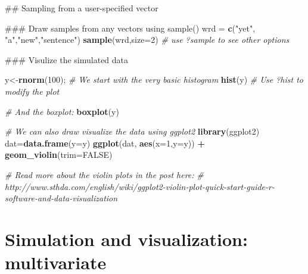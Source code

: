 \documentclass[12pt,]{book}
\newenvironment{Shaded}{\begin{snugshade}}{\end{snugshade}}
\newcommand{\KeywordTok}[1]{\textcolor[rgb]{0.13,0.29,0.53}{\textbf{#1}}}
\newcommand{\DataTypeTok}[1]{\textcolor[rgb]{0.13,0.29,0.53}{#1}}
\newcommand{\DecValTok}[1]{\textcolor[rgb]{0.00,0.00,0.81}{#1}}
\newcommand{\StringTok}[1]{\textcolor[rgb]{0.31,0.60,0.02}{#1}}
\newcommand{\CommentTok}[1]{\textcolor[rgb]{0.56,0.35,0.01}{\textit{#1}}}
\newcommand{\OtherTok}[1]{\textcolor[rgb]{0.56,0.35,0.01}{#1}}
\newcommand{\OperatorTok}[1]{\textcolor[rgb]{0.81,0.36,0.00}{\textbf{#1}}}
\newcommand{\NormalTok}[1]{#1}
\begin{document}
\begin{Shaded}
\begin{Highlighting}[]
\NormalTok{## Sampling from a user-specified vector }

\NormalTok{### Draw samples from any vectors using sample()}
\NormalTok{wrd =}\StringTok{ }\KeywordTok{c}\NormalTok{(}\StringTok{"yet"}\NormalTok{, }\StringTok{"a"}\NormalTok{,}\StringTok{"new"}\NormalTok{,}\StringTok{"sentence"}\NormalTok{)}
\KeywordTok{sample}\NormalTok{(wrd,}\DataTypeTok{size=}\DecValTok{2}\NormalTok{)}
\CommentTok{# use ?sample to see other options}
\end{Highlighting}
\end{Shaded}

\begin{Shaded}
\begin{Highlighting}[]
\NormalTok{### Visulize the simulated data}

\NormalTok{y<-}\KeywordTok{rnorm}\NormalTok{(}\DecValTok{100}\NormalTok{);}
\CommentTok{# We start with the very basic histogram }
\KeywordTok{hist}\NormalTok{(y)}
\CommentTok{# Use ?hist to modify the plot }

\CommentTok{# And the boxplot:}
\KeywordTok{boxplot}\NormalTok{(y)}

\CommentTok{# We can also draw visualize the data using ggplot2}
\KeywordTok{library}\NormalTok{(ggplot2)}
\NormalTok{dat=}\KeywordTok{data.frame}\NormalTok{(}\DataTypeTok{y=}\NormalTok{y)}
\KeywordTok{ggplot}\NormalTok{(dat, }\KeywordTok{aes}\NormalTok{(}\DataTypeTok{x=}\DecValTok{1}\NormalTok{,}\DataTypeTok{y=}\NormalTok{y)) }\OperatorTok{+}\StringTok{ }
\StringTok{  }\KeywordTok{geom_violin}\NormalTok{(}\DataTypeTok{trim=}\OtherTok{FALSE}\NormalTok{)}

\CommentTok{# Read more about the violin plots in the post here:}
\CommentTok{# http://www.sthda.com/english/wiki/ggplot2-violin-plot-quick-start-guide-r-software-and-data-visualization}
\end{Highlighting}
\end{Shaded}

\section{Simulation and visualization:
multivariate}\label{simulation-and-visualization-multivariate}
\end{document}
